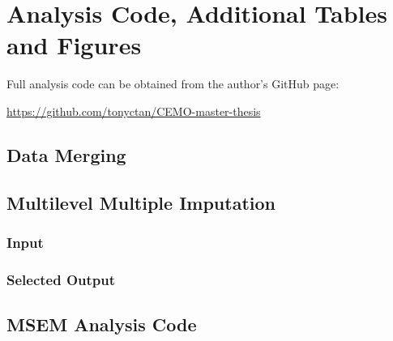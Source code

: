 \section{Analysis Code, Additional Tables and Figures}

Full analysis code can be obtained from the author's GitHub page:

\href{https://github.com/tonyctan/CEMO-master-thesis}{https://github.com/tonyctan/CEMO-master-thesis}

\subsection{Data Merging}\label{R.reimport}

\begin{MAEcode}
    
\end{MAEcode}





\subsection{Multilevel Multiple Imputation}

\subsubsection{\cM Input}\label{sec:MMI}

\begin{MAEcode}
    
\end{MAEcode}

\subsubsection{Selected \cM Output}

\begin{MAEcode}
    
\end{MAEcode}





\subsection{MSEM Analysis Code}

